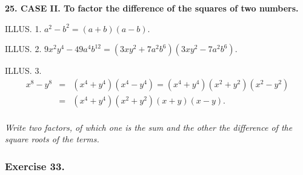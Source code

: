 \documentclass{book}
\begin{document}
\textbf{ 25. CASE II. To factor the difference of the squares of
two numbers.}

ILLUS. 1. $a^2-b^2=(a+b)(a-b)$.

ILLUS. 2. $9x^2y^4-49a^4b^{12}=(3xy^2+7a^2b^6)(3xy^2-7a^2b^6)$.

ILLUS. 3.
\begin{eqnarray*}
x^8-y^8 & = & (x^4+y^4)(x^4-y^4)=(x^4+y^4)(x^2+y^2)(x^2-y^2) \\
& = & (x^4+y^4)(x^2+y^2)(x+y)(x-y). \\
\end{eqnarray*}

\textit{ Write two factors, of which one is the sum and the other
the difference of the square roots of the terms.}

\subsubsection*{Exercise 33.}
\end{document}
